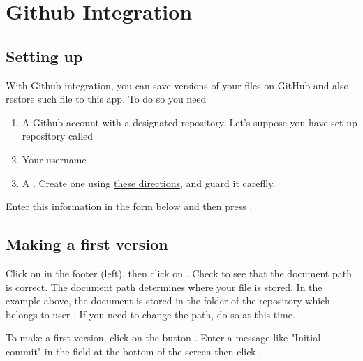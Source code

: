 \section{Github Integration}

\subsection{Setting up}

With Github integration, you can save versions of your files on GitHub and also restore such file to this app.  To do so you need

\begin{enumerate}

\item A Github account with a designated repository.  Let's suppose you have set up  repository called 

\item Your username

\item A  .  Create one using \href{https://docs.github.com/en/free-pro-team@latest/github/authenticating-to-github/creating-a-personal-access-token}{these directions}, and guard it careflly.

\end{enumerate}

Enter this information in the form below and then press .


\subsection{Making a first version}

Click on  in the footer (left), then click on .  Check to see that the document path is correct.  The document path determines where your file is stored.  In the example above, the document  is stored in the folder  of the repository   which belongs to user .  If you need to change the path, do so at this time.

To make a first version, click on the button . Enter a message like "Initial commit" in the field at the bottom of the screen then click .


